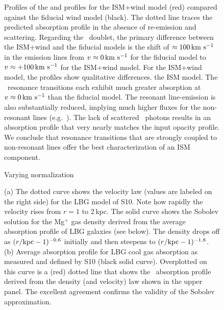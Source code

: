 \documentclass[12pt,preprint]{aastex}
\begin{document}
\begin{figure}
\caption{
Profiles of the  and  profiles for the ISM+wind
model (red) compared against the fiducial wind model (black). 
The dotted line traces the predicted absorption profile in the absence
of re-emission and scattering.
Regarding the ~doublet, the primary difference between the
ISM+wind and the fiducial models is the shift of $\approx 100 \, {\rm km~s^{-1}}$
in the emission lines from $v \approx 0 \, {\rm km~s^{-1}}$ for the fiducial
model to $v \approx +100\, {\rm km~s^{-1}}$ for the ISM+wind model. 
For the ISM+wind model, 
the  profiles show qualitative differences. 
the ISM model.  The \feiid\ resonance transitions each exhibit much
greater absorption at $v \approx 0 \, {\rm km~s^{-1}}$ than the fiducial model.
The resonant line-emission is also substantially
reduced, implying much higher fluxes for the non-resonant lines (e.g.\
\feiic).  The lack of scattered \feiia\ photons results in an
absorption profile that very nearly matches the input opacity profile.
We conclude that resonance transitions that are strongly coupled to
non-resonant lines offer the best
characterization of an ISM component.
}
\label{fig:ISM_spec}
\end{figure}

\begin{figure}
\caption{
Varying normalization
}
\label{fig:norm}
\end{figure}

\begin{figure}
\caption{
(a) The dotted curve shows the velocity law (values are labeled on the
right side) for the LBG model
of S10.  Note how rapidly the velocity rises from $r =
1$ to 2\,kpc.  The solid curve shows the Sobolev solution for the
Mg$^+$ gas
density derived from 
the average absorption profile of LBG galaxies (see below).
The density drops off as $(r/{\rm kpc}-1)^{-0.6}$ initially and then
steepens to $(r/{\rm kpc}-1)^{-1.8}$.
(b) Average absorption profile for LBG cool gas absorption as
measured and defined by S10
(black solid curve).  Overplotted on this curve is a (red) dotted line that
shows the \mgiia\ absorption profile derived from the density (and velocity)
law shown in the upper panel.  The excellent agreement confirms the
validity of the Sobolev approximation.
}
\label{fig:LBG_Sobolev}
\end{figure}
\end{document}
